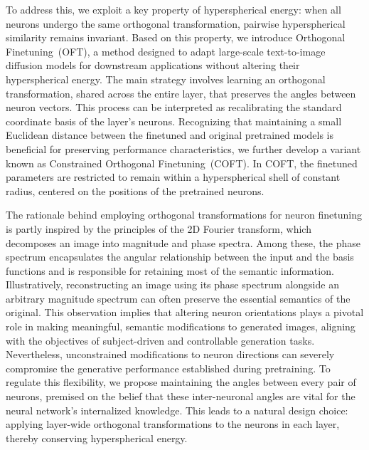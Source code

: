 To address this, we exploit a key property of hyperspherical energy: when all neurons undergo the same orthogonal transformation, pairwise hyperspherical similarity remains invariant. Based on this property, we introduce Orthogonal Finetuning~(OFT), a method designed to adapt large-scale text-to-image diffusion models for downstream applications without altering their hyperspherical energy. The main strategy involves learning an orthogonal transformation, shared across the entire layer, that preserves the angles between neuron vectors. This process can be interpreted as recalibrating the standard coordinate basis of the layer’s neurons. Recognizing that maintaining a small Euclidean distance between the finetuned and original pretrained models is beneficial for preserving performance characteristics, we further develop a variant known as Constrained Orthogonal Finetuning~(COFT). In COFT, the finetuned parameters are restricted to remain within a hyperspherical shell of constant radius, centered on the positions of the pretrained neurons.

The rationale behind employing orthogonal transformations for neuron finetuning is partly inspired by the principles of the 2D Fourier transform, which decomposes an image into magnitude and phase spectra. Among these, the phase spectrum encapsulates the angular relationship between the input and the basis functions and is responsible for retaining most of the semantic information. Illustratively, reconstructing an image using its phase spectrum alongside an arbitrary magnitude spectrum can often preserve the essential semantics of the original. This observation implies that altering neuron orientations plays a pivotal role in making meaningful, semantic modifications to generated images, aligning with the objectives of subject-driven and controllable generation tasks. Nevertheless, unconstrained modifications to neuron directions can severely compromise the generative performance established during pretraining. To regulate this flexibility, we propose maintaining the angles between every pair of neurons, premised on the belief that these inter-neuronal angles are vital for the neural network’s internalized knowledge. This leads to a natural design choice: applying layer-wide orthogonal transformations to the neurons in each layer, thereby conserving hyperspherical energy.

